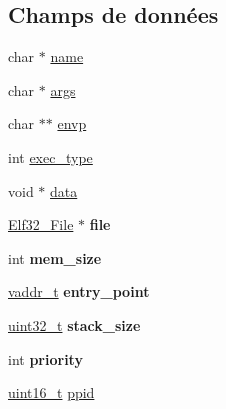 \subsection*{Champs de données}
\begin{DoxyCompactItemize}
\item 
char $\ast$ \hyperlink{structprocess__init__data__t_a6bdcab0bceaafa6e65a236904fb5a157}{name}
\item 
char $\ast$ \hyperlink{structprocess__init__data__t_a16d011771835f06e0bb3d5fd6115e13c}{args}
\item 
char $\ast$$\ast$ \hyperlink{structprocess__init__data__t_a863d82fbd718f53164a520f67376eac2}{envp}
\item 
int \hyperlink{structprocess__init__data__t_a1cda790f7d2446a04562094f09e358ab}{exec\-\_\-type}
\item 
void $\ast$ \hyperlink{structprocess__init__data__t_ae950cc2a2cc04d1c00a71f70c2fde72c}{data}
\item 
\hypertarget{structprocess__init__data__t_a423d726f5e4621a1aae6a6d96ed2c380}{\hyperlink{structElf32__File}{Elf32\-\_\-\-File} $\ast$ {\bfseries file}}\label{structprocess__init__data__t_a423d726f5e4621a1aae6a6d96ed2c380}

\item 
\hypertarget{structprocess__init__data__t_ae720e802d58d2f1457e34998063695a1}{int {\bfseries mem\-\_\-size}}\label{structprocess__init__data__t_ae720e802d58d2f1457e34998063695a1}

\item 
\hypertarget{structprocess__init__data__t_acf333ed57db9a2ca636801dcbc41da7e}{\hyperlink{types_8h_a53428b953a0ae6fba02a5b3596c867e0}{vaddr\-\_\-t} {\bfseries entry\-\_\-point}}\label{structprocess__init__data__t_acf333ed57db9a2ca636801dcbc41da7e}

\item 
\hypertarget{structprocess__init__data__t_a8a9c2d2d0d602f8e2f3dc2f4c425da29}{\hyperlink{types_8h_a33594304e786b158f3fb30289278f5af}{uint32\-\_\-t} {\bfseries stack\-\_\-size}}\label{structprocess__init__data__t_a8a9c2d2d0d602f8e2f3dc2f4c425da29}

\item 
\hypertarget{structprocess__init__data__t_a3147915ee1aa09fd84245e28635c60c8}{int {\bfseries priority}}\label{structprocess__init__data__t_a3147915ee1aa09fd84245e28635c60c8}

\item 
\hyperlink{types_8h_adf4d876453337156dde61095e1f20223}{uint16\-\_\-t} \hyperlink{structprocess__init__data__t_a34f85f3f56546700b1dc942070944e27}{ppid}
\end{DoxyCompactItemize}


